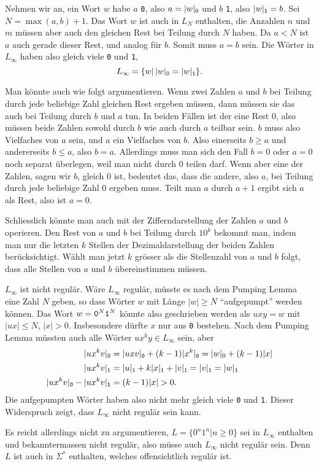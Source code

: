 \begin{loesung}
\begin{teilaufgaben}
\item Nehmen wir an, ein Wort $w$ habe $a$ {\tt 0}, also $a=|w|_{\tt 0}$ und
$b$ {\tt 1}, also $|w|_{\tt 1}=b$.
Sei $N=\max(a,b) + 1$. Das Wort $w$ ist auch in $L_N$ enthalten,
die Anzahlen $n$ und $m$ müssen aber auch den gleichen Rest bei
Teilung durch $N$ haben. Da $a<N$ ist $a$ auch gerade dieser Rest,
und analog für $b$. Somit muss $a=b$ sein. Die Wörter in
$L_\infty$ haben also gleich viele {\tt 0} und {\tt 1},
\[
L_\infty=\{w|\,|w|_{\tt 0}=|w|_{\tt 1}\}.
\]

Man könnte auch wie folgt argumentieren. Wenn zwei Zahlen $a$ und $b$
bei Teilung durch jede beliebige Zahl gleichen Rest ergeben müssen,
dann müssen sie das auch bei Teilung durch $b$ und $a$ tun. In beiden
Fällen ist der eine Rest $0$, also müssen beide Zahlen sowohl durch
$b$ wie auch durch $a$ teilbar sein. $b$ muss also Vielfaches von $a$
sein, und $a$ ein Vielfaches von $b$. Also einerseits $b\ge a$ und andererseits
$b\le a$, also $b=a$. Allerdings muss man sich den Fall $b=0$ oder $a=0$
noch separat überlegen, weil man nicht durch $0$ teilen darf. Wenn
aber eine der Zahlen, sagen wir $b$, gleich $0$ ist, bedeutet das, dass
die andere, also $a$, bei Teilung durch jede beliebige Zahl $0$ ergeben
muss. Teilt man $a$ durch $a+1$ ergibt sich $a$ als Rest, also ist $a=0$.

Schliesslich könnte man auch mit der Zifferndarstellung der Zahlen
$a$ und $b$ operieren. Den Rest von $a$ und $b$ bei Teilung durch
$10^k$ bekommt man, indem man nur die letzten $k$ Stellen der
Dezimaldarstellung der beiden Zahlen berücksichtigt. Wählt man
jetzt $k$ grösser als die Stellenzahl von $a$ und $b$ folgt,
dass alle Stellen von $a$ und $b$ übereinstimmen müssen.

\item $L_\infty$ ist nicht regulär. Wäre $L_\infty$ regulär,
müsste es nach dem Pumping Lemma eine Zahl $N$ geben, so dass
Wörter $w$ mit Länge $|w|\ge N$ ``aufgepumpt'' werden können.
Das Wort $w={\tt 0}^N{\tt 1}^N$ könnte also geschrieben werden
als $uxy=w$ mit $|ux|\le N$, $|x|>0$. Insbesondere dürfte $x$ nur
aus {\tt 0} bestehen. Nach dem Pumping Lemma müssten auch alle
Wörter $ux^ky\in L_\infty$ sein, aber
\begin{align*}
|ux^kv|_{\tt 0}
&=
|uxv|_{\tt 0}
+
(k-1) |x^k|_{\tt 0}
=
|w|_0+(k-1)|x|
\\
|ux^kv|_{\tt 1}
&=
|u|_{\tt 1} + k|x|_{\tt 1} + |v|_{\tt 1}
=
|v|_{\tt 1}
=|w|_{\tt 1}
\\
|ux^kv|_{\tt 0}
-
|ux^kv|_{\tt 1}
&=
(k-1)|x|>0.
\end{align*}
Die aufgepumpten Wörter haben also nicht mehr gleich viele
{\tt 0} und {\tt 1}. Dieser Widerspruch zeigt, dass $L_\infty$
nicht regulär sein kann.

Es reicht allerdings nicht zu argumentieren, $L=\{ 0^n1^n|n \ge 0\}$
sei in $L_\infty$ enthalten und bekanntermassen nicht regulär,
also müsse auch $L_\infty$ nicht regulär sein. Denn $L$ ist auch
in $\Sigma^*$ enthalten, welches offensichtlich regulär ist.
\qedhere
\end{teilaufgaben}
\end{loesung}


